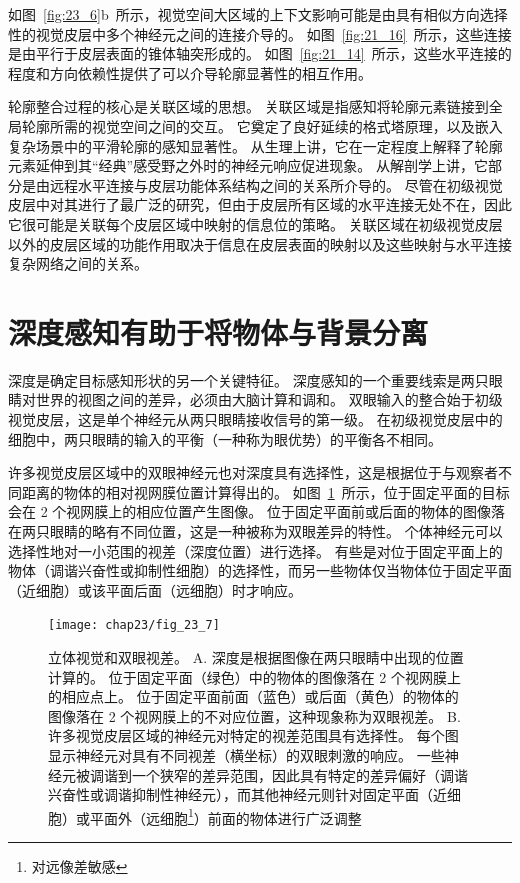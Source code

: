 如图~\ref{fig:23_6}b~所示，视觉空间大区域的上下文影响可能是由具有相似方向选择性的视觉皮层中多个神经元之间的连接介导的。
如图~\ref{fig:21_16}~所示，这些连接是由平行于皮层表面的锥体轴突形成的。
如图~\ref{fig:21_14}~所示，这些水平连接的程度和方向依赖性提供了可以介导轮廓显著性的相互作用。


轮廓整合过程的核心是关联区域的思想。
关联区域是指感知将轮廓元素链接到全局轮廓所需的视觉空间之间的交互。
它奠定了良好延续的格式塔原理，以及嵌入复杂场景中的平滑轮廓的感知显著性。
从生理上讲，它在一定程度上解释了轮廓元素延伸到其“经典”感受野之外时的神经元响应促进现象。
从解剖学上讲，它部分是由远程水平连接与皮层功能体系结构之间的关系所介导的。
尽管在初级视觉皮层中对其进行了最广泛的研究，但由于皮层所有区域的水平连接无处不在，因此它很可能是关联每个皮层区域中映射的信息位的策略。
关联区域在初级视觉皮层以外的皮层区域的功能作用取决于信息在皮层表面的映射以及这些映射与水平连接复杂网络之间的关系。



\section{深度感知有助于将物体与背景分离}

深度是确定目标感知形状的另一个关键特征。
深度感知的一个重要线索是两只眼睛对世界的视图之间的差异，必须由大脑计算和调和。
双眼输入的整合始于初级视觉皮层，这是单个神经元从两只眼睛接收信号的第一级。
在初级视觉皮层中的细胞中，两只眼睛的输入的平衡（一种称为眼优势）的平衡各不相同。


许多视觉皮层区域中的双眼神经元也对深度具有选择性，这是根据位于与观察者不同距离的物体的相对视网膜位置计算得出的。
如图~\ref{fig:23_7}~所示，位于固定平面的目标会在 2 个视网膜上的相应位置产生图像。
位于固定平面前或后面的物体的图像落在两只眼睛的略有不同位置，这是一种被称为双眼差异的特性。
个体神经元可以选择性地对一小范围的视差（深度位置）进行选择。
有些是对位于固定平面上的物体（调谐兴奋性或抑制性细胞）的选择性，而另一些物体仅当物体位于固定平面（近细胞）或该平面后面（远细胞）时才响应。


\begin{figure}[htbp]
	\centering
	\texttt{[image: chap23/fig\_23\_7]}
	\caption{立体视觉和双眼视差。
		A. 深度是根据图像在两只眼睛中出现的位置计算的。
		位于固定平面（绿色）中的物体的图像落在 2 个视网膜上的相应点上。
		位于固定平面前面（蓝色）或后面（黄色）的物体的图像落在 2 个视网膜上的不对应位置，这种现象称为双眼视差。
		B. 许多视觉皮层区域的神经元对特定的视差范围具有选择性。
		每个图显示神经元对具有不同视差（横坐标）的双眼刺激的响应。
		一些神经元被调谐到一个狭窄的差异范围，因此具有特定的差异偏好（调谐兴奋性或调谐抑制性神经元），而其他神经元则针对固定平面（近细胞）或平面外（远细胞\footnote{对远像差敏感}）前面的物体进行广泛调整\cite{poggio1995mechanisms}}
	\label{fig:23_7}
\end{figure}



